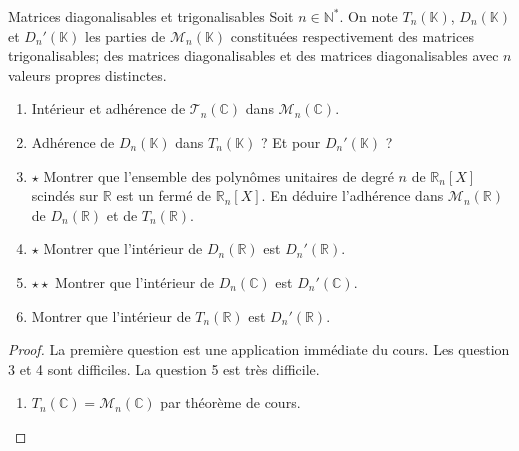 \documentclass[french,a4paper]{article}
\newcommand{\N}{\mathbb{N}}
\newcommand{\R}{\mathbb{R}}
\newcommand{\C}{\mathbb{C}}
\newcommand{\K}{\mathbb{K}}
\newcommand{\st}{^*}
\theoremstyle{plain}
\theoremstyle{definition}
\theoremstyle{remark}
\begin{document}
\begin{ex}{Matrices diagonalisables et trigonalisables}
	Soit $n\in\N\st$. On note $T_n(\K)$, $D_n(\K)$ et $D_n'(\K)$ les parties de $\mathcal{M}_n(\K)$ constituées respectivement des matrices trigonalisables; des matrices diagonalisables et des matrices diagonalisables avec $n$ valeurs propres distinctes.
	\begin{enumerate}
		\item Intérieur et adhérence de $\mathcal{T}_n(\C)$ dans $\mathcal{M}_n(\C)$.
		\item Adhérence de $D_n(\K)$ dans $T_n(\K)$ ? Et pour $D_n'(\K)$ ?
		\item $\star$ Montrer que l'ensemble des polynômes unitaires de degré $n$ de $\R_n[X]$ scindés sur $\R$ est un fermé de $\R_n[X]$. En déduire l'adhérence dans $\mathcal{M}_n(\R)$ de $D_n(\R)$ et de $T_n(\R)$.
		\item $\star$ Montrer que l'intérieur de $D_n(\R)$ est $D_n'(\R)$.
		\item $\star\star$ Montrer que l'intérieur de $D_n(\C)$ est $D_n'(\C)$.
		\item Montrer que l'intérieur de $T_n(\R)$ est $D_n'(\R)$.
	\end{enumerate}
\end{ex}
\begin{proof}
	La première question est une application immédiate du cours. Les question 3 et 4 sont difficiles. La question 5 est très difficile.
	\begin{enumerate}
		\item $T_n(\C)=\mathcal{M}_n(\C)$ par théorème de cours.
	\end{enumerate}
\end{proof}
\end{document}

